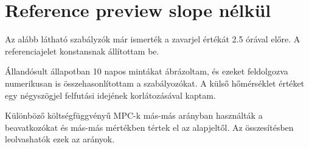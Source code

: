 
\section{Reference preview slope nélkül}

 
 Az alább látható szabályzók már ismerték a zavarjel értékát 2.5 órával előre. A referenciajelet konstansnak állítottam be.
 
 Állandósult állapotban 10 napos mintákat ábrázoltam, és ezeket feldolgozva numerikusan is összehasonlítottam a szabályozókat.
 A külső hőmérséklet értéket egy négyszögjel felfutási idejének korlátozásával kaptam.
 
 Különböző költségfüggvényű MPC-k más-más arányban használták a beavatkozókat és más-más mértékben tértek el az alapjeltől. Az összesítésben leolvashatók ezek az arányok.
 
